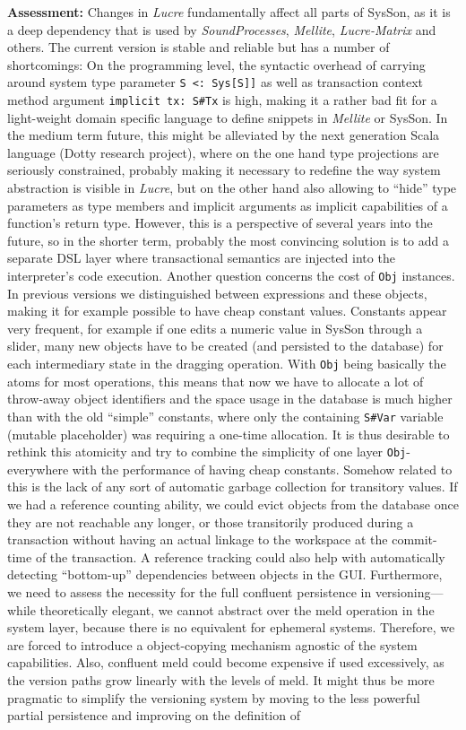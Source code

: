 \documentclass[11pt,a4paper]{article}
\newcommand{\software}[1]{\textit{#1}}
\newcommand{\sysson}[0]{SysSon}
\begin{document}
\textbf{Assessment:} Changes in \software{Lucre} fundamentally affect all parts of \sysson{}, as it is a deep dependency that is used by \software{SoundProcesses}, \software{Mellite}, \software{Lucre-Matrix} and others. The current version is stable and reliable but has a number of shortcomings: On the programming level, the syntactic overhead of carrying around system type parameter \verb!S <: Sys[S]]! as well as transaction context method argument \verb!implicit tx: S#Tx! is high, making it a rather bad fit for a light-weight domain specific language to define snippets in \software{Mellite} or \sysson{}. In the medium term future, this might be alleviated by the next generation Scala language (Dotty research project), where on the one hand type projections are seriously constrained, probably making it necessary to redefine the way system abstraction is visible in \software{Lucre}, but on the other hand also allowing to ``hide'' type parameters as type members and implicit arguments as implicit capabilities of a function's return type. However, this is a perspective of several years into the future, so in the shorter term, probably the most convincing solution is to add a separate DSL layer where transactional semantics are injected into the interpreter's code execution. Another question concerns the cost of \verb!Obj! instances. In previous versions we distinguished between expressions and these objects, making it for example possible to have cheap constant values. Constants appear very frequent, for example if one edits a numeric value in \sysson{} through a slider, many new objects have to be created (and persisted to the database) for each intermediary state in the dragging operation. With \verb!Obj! being basically the atoms for most operations, this means that now we have to allocate a lot of throw-away object identifiers and the space usage in the database is much higher than with the old ``simple'' constants, where only the containing \verb!S#Var! variable (mutable placeholder) was requiring a one-time allocation. It is thus desirable to rethink this atomicity and try to combine the simplicity of one layer \verb!Obj!-everywhere with the performance of having cheap constants. Somehow related to this is the lack of any sort of automatic garbage collection for transitory values. If we had a reference counting ability, we could evict objects from the database once they are not reachable any longer, or those transitorily produced during a transaction without having an actual linkage to the workspace at the commit-time of the transaction. A reference tracking could also help with automatically detecting ``bottom-up'' dependencies between objects in the GUI. Furthermore, we need to assess the necessity for the full confluent persistence in versioning---while theoretically elegant, we cannot abstract over the meld operation in the system layer, because there is no equivalent for ephemeral systems. Therefore, we are forced to introduce a object-copying mechanism agnostic of the system capabilities. Also, confluent meld could become expensive if used excessively, as the version paths grow linearly with the levels of meld. It might thus be more pragmatic to simplify the versioning system by moving to the less powerful partial persistence and improving on the definition of 
\end{document}
